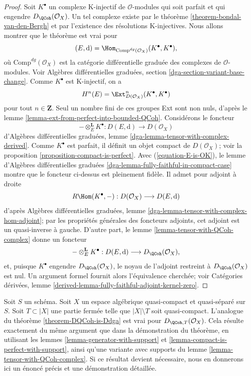 \begin{proof}
Soit $K^\bullet$ un complexe K-injectif de $\mathcal{O}$-modules qui soit
parfait et qui engendre $D_\QCoh(\mathcal{O}_X)$. Un tel complexe existe par le
th\'eor\`eme \ref{theorem-bondal-van-den-Bergh} et par l'existence des
r\'esolutions K-injectives. Nous allons montrer que le th\'eor\`eme est vrai pour
$$
(E, \text{d}) = \Hom_{\text{Comp}^{dg}(\mathcal{O}_X)}(K^\bullet, K^\bullet),
$$
o\`u $\text{Comp}^{dg}(\mathcal{O}_X)$ est la cat\'egorie diff\'erentielle
gradu\'ee des complexes de $\mathcal{O}$-modules. Voir Alg\`ebres
diff\'erentielles gradu\'ees, section
\ref{dga-section-variant-base-change}. Comme $K^\bullet$ est K-injectif, on a
\begin{equation}
\label{equation-E-is-OK}
H^n(E) = \Ext^n_{D(\mathcal{O}_X)}(K^\bullet, K^\bullet)
\end{equation}
pour tout $n\in\mathbf{Z}$. Seul un nombre fini de ces groupes Ext sont non
nuls, d'apr\`es le lemme \ref{lemma-ext-from-perfect-into-bounded-QCoh}.
Consid\'erons le foncteur
$$
- \otimes_E^\mathbf{L} K^\bullet :
D(E, \text{d}) \longrightarrow D(\mathcal{O}_X)
$$
d'Alg\`ebres diff\'erentielles gradu\'ees, lemme
\ref{dga-lemma-tensor-with-complex-derived}. Comme $K^\bullet$ est parfait, il
d\'efinit un objet compact de $D(\mathcal{O}_X)$; voir la proposition
\ref{proposition-compact-is-perfect}. Avec (\ref{equation-E-is-OK}), le lemme
d'Alg\`ebres diff\'erentielles gradu\'ees
\ref{dga-lemma-fully-faithful-in-compact-case} montre que le foncteur ci-dessus
est pleinement fid\`ele. Il admet pour adjoint \`a droite
$$
R\Hom(K^\bullet, - ) : D(\mathcal{O}_X) \longrightarrow D(E, \text{d})
$$
d'apr\`es Alg\`ebres diff\'erentielles gradu\'ees, lemme
\ref{dga-lemma-tensor-with-complex-hom-adjoint}; par les propri\'et\'es g\'en\'erales
des foncteurs adjoints, cet adjoint est un quasi-inverse \`a gauche. D'autre
part, le lemme \ref{lemma-tensor-with-QCoh-complex} donne un foncteur
$$
- \otimes_E^\mathbf{L} K^\bullet :
D(E, \text{d}) \longrightarrow D_\QCoh(\mathcal{O}_X),
$$
et, puisque $K^\bullet$ engendre $D_\QCoh(\mathcal{O}_X)$, le noyau de
l'adjoint restreint \`a $D_\QCoh(\mathcal{O}_X)$ est nul. Un argument formel
fournit alors l'\'equivalence cherch\'ee; voir Cat\'egories d\'eriv\'ees, lemme
\ref{derived-lemma-fully-faithful-adjoint-kernel-zero}.
\end{proof}

\begin{remark}
\label{remark-DQCoh-is-Ddga-with-support}
Soit $S$ un sch\'ema. Soit $X$ un espace alg\'ebrique quasi-compact et
quasi-s\'epar\'e sur $S$. Soit $T\subset|X|$ une partie ferm\'ee telle que
$|X|\setminus T$ soit quasi-compact. L'analogue du th\'eor\`eme
\ref{theorem-DQCoh-is-Ddga} est vrai pour
$D_{\QCoh,T}(\mathcal{O}_X)$. Cela r\'esulte exactement du m\^eme argument que
dans la d\'emonstration du th\'eor\`eme, en utilisant les lemmes
\ref{lemma-generator-with-support} et
\ref{lemma-compact-is-perfect-with-support}, ainsi qu'une variante avec
supports du lemme \ref{lemma-tensor-with-QCoh-complex}. Si ce r\'esultat devient
n\'ecessaire, nous en donnerons ici un \'enonc\'e pr\'ecis et une d\'emonstration
d\'etaill\'ee.
\end{remark}

